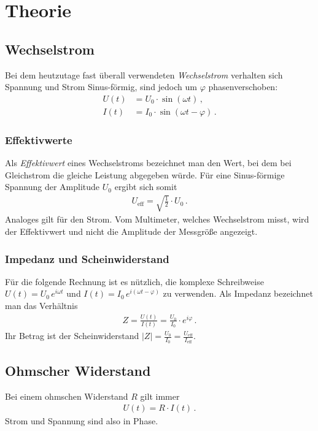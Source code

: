 \documentclass[12pt,a4paper,titlepage,headinclude,bibtotoc]{scrartcl}
\begin{document}
\section{Theorie}
\label{sec:theorie}
\subsection{Wechselstrom}
Bei dem heutzutage fast überall verwendeten \textit{Wechselstrom} verhalten sich Spannung und Strom Sinus-förmig, sind jedoch um $\varphi$ phasenverschoben:
\begin{align}
	U(t)&=U_0\cdot\sin(\omega t)\,,\\
	I(t)&=I_0\cdot\sin(\omega t-\varphi)\,.
\end{align}

\subsubsection{Effektivwerte}
Als \textit{Effektivwert} eines Wechselstroms bezeichnet man den Wert, bei dem bei Gleichstrom die gleiche Leistung abgegeben würde.
Für eine Sinus-förmige Spannung der Amplitude $U_0$ ergibt sich somit
\begin{align}
	U_\text{eff}=\sqrt{\frac{1}{2}}\cdot U_0 \,.
\end{align}
Analoges gilt für den Strom.
Vom Multimeter, welches Wechselstrom misst, wird der Effektivwert und nicht die Amplitude der Messgröße angezeigt.

\subsubsection{Impedanz und Scheinwiderstand}
Für die folgende Rechnung ist es nützlich, die komplexe Schreibweise $U(t)=U_0 \, e^{i\omega t}$ und $I(t)=I_0 \, e^{i(\omega t - \varphi)}$ zu verwenden.
Als Impedanz bezeichnet man das Verhältnis
\begin{align}
	Z=\frac{U(t)}{I(t)}=\frac{U_0}{I_0}\cdot e^{i\varphi}\,.
\end{align}
Ihr Betrag ist der Scheinwiderstand $|Z|=\frac{U_0}{I_0}=\frac{U_\text{eff}}{I_\text{eff}}$.

\subsection{Ohmscher Widerstand}
Bei einem ohmschen Widerstand $R$ gilt immer
\begin{align}
	U(t)=R \cdot I(t)\,.
\end{align}
Strom und Spannung sind also in Phase.
\end{document}
